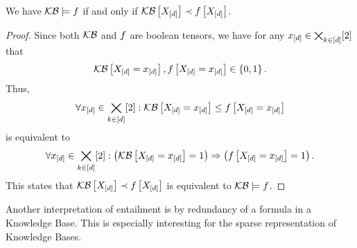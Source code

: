 \begin{theorem}
    \label{the:orderingEntailmentCriterion}
    We have $\mathcal{KB}\models f$ if and only if $\mathcal{KB}\left[X_{[d]}\right]\prec f\left[X_{[d]}\right]$.
\end{theorem}
\begin{proof}
    Since both $\mathcal{KB}$ and $f$ are boolean tensors, we have for any $x_{[d]}\in\bigtimes_{k\in[d]}[2]$ that
    \begin{align*}
        \mathcal{KB}\left[X_{[d]}=x_{[d]}\right],f\left[X_{[d]}=x_{[d]}\right]\in\{0,1\} \, .
    \end{align*}
    Thus,
    \begin{align*}
        \forall{x_{[d]}\in\bigtimes_{k\in[d]}[2]}:{\mathcal{KB}\left[X_{[d]}=x_{[d]}\right]\leq f\left[X_{[d]}=x_{[d]}\right]}
    \end{align*}
    is equivalent to
    \begin{align*}
        \forall{x_{[d]}\in\bigtimes_{k\in[d]}[2]}:{\left(\mathcal{KB}\left[X_{[d]}=x_{[d]}\right]=1\right)\Rightarrow\left(f\left[X_{[d]}=x_{[d]}\right]=1\right)} \, .
    \end{align*}
    This states that $\mathcal{KB}\left[X_{[d]}\right]\prec f\left[X_{[d]}\right]$ is equivalent to $\mathcal{KB}\models f$.
\end{proof}




Another interpretation of entailment is by redundancy of a formula in a Knowledge Base.
This is especially interesting for the sparse representation of Knowledge Bases.

